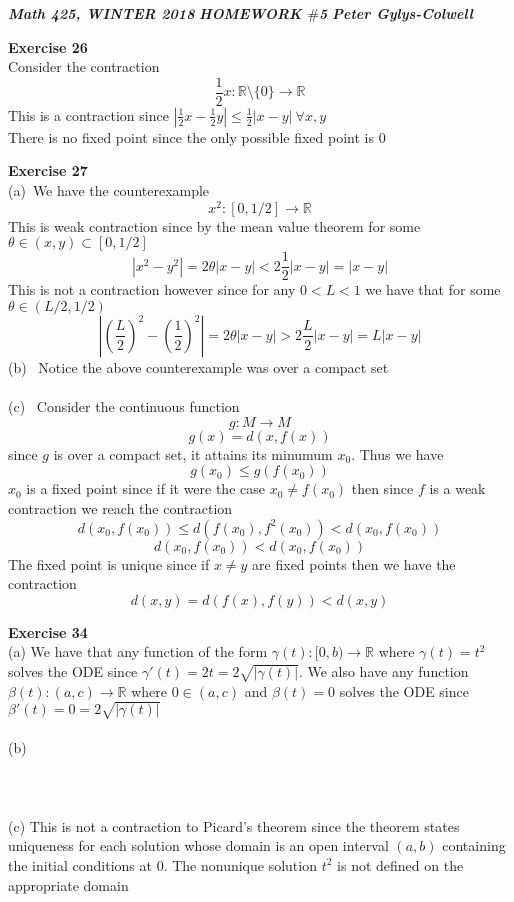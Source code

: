 \documentclass[12pt]{article}
\newenvironment{ques}[1]{\textbf{Exercise #1}\vspace{1 mm}\\ }{\bigskip}
\theoremstyle{definition}
\renewcommand{\l}{\left }
\renewcommand{\r}{\right }
\newcommand{\R}{\mathbb R}
\renewcommand{\t}{\theta}
\begin{document}
\noindent \textit{\textbf{Math 425, WINTER 2018}} \hspace{1.3cm}
\textit{\textbf{HOMEWORK $\#$5}} \hspace{1.3cm} \textit{\textbf{Peter
Gylys-Colwell}} 

\vspace{1cm}

\begin{ques}{26}
	Consider the contraction
	$$\frac 1 2 x: \R \setminus \{0\} \to \R$$
	This is a contraction since $|\frac 1 2 x - \frac 1 2 y| \leq \frac 1 2 |x
	- y|\ \forall x, y$\\
	There is no fixed point since the only possible fixed point is $0$
\end{ques}

\begin{ques}{27}
	(a)\ We have the counterexample
	$$x^2:[0,1/2] \to \R$$
	This is weak contraction since by the mean value theorem for some $\t \in
	(x,y) \subset [0,1/2]$
	$$|x^2 - y^2| = 2\t|x - y| < 2\frac 1 2 |x - y| = |x - y|$$
	This is not a contraction however since for any $0 < L < 1$ we have that
	for some $\t \in (L/2,1/2)$
	$$\l|\l(\frac L 2\r)^2 - \l(\frac {1} 2\r)^2\r| = 2\t|x - y| > 2\frac L 2
	|x - y| = L|x - y|$$
	(b) \ Notice the above counterexample was over a compact set\\
	\\
	(c) \ Consider the continuous function
	$$g:M \to M$$
	$$g(x) = d(x,f(x))$$
	since $g$ is over a compact set, it attains its minumum $x_0$. Thus we have
	$$g(x_0) \leq g(f(x_0))$$
	$x_0$ is a fixed point since if it were the case $x_0 \neq f(x_0)$ then
	since $f$ is a weak contraction we reach the contraction
	$$d(x_0,f(x_0)) \leq d(f(x_0),f^2(x_0)) < d(x_0,f(x_0))$$
	$$d(x_0,f(x_0))  < d(x_0,f(x_0))$$
	The fixed point is unique since if $x\neq y$ are fixed points then we have
	the contraction
	$$d(x,y) = d(f(x),f(y)) < d(x,y)$$
\end{ques}

\begin{ques}{34}
	(a) We have that any function of the form $\gamma(t):[0,b) \to \R$ where
	$\gamma(t) = t^2$ solves the ODE since $\gamma'(t) = 2t =
	2\sqrt{|\gamma(t)|}$. We also have any function $\beta(t):(a,c) \to
	\R$ where $0 \in (a,c)$ and $\beta(t) = 0$ solves the ODE since $\beta'(t) =0 =
	2\sqrt{|\gamma(t)|}$\\
	\\
	(b)\\
	\\
	\\
	\\
	(c) This is not a contraction to Picard's theorem since the theorem states
	uniqueness for each solution whose domain is an open interval $(a,b)$
	containing the initial conditions at $0$. The nonunique solution $t^2$ is
	not defined on the appropriate domain
\end{ques}
\end{document}
